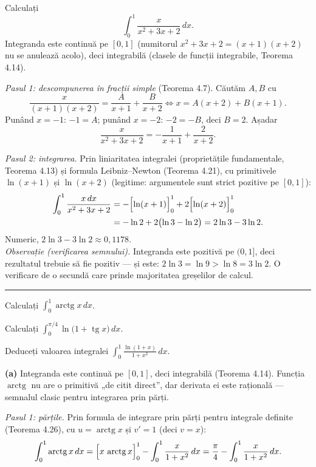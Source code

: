 Calculați
\[ \int_{0}^{1}\frac{x}{x^{2}+3x+2}\,dx . \]
\sol Integranda este continuă pe $[0,1]$ (numitorul $x^{2}+3x+2=(x+1)(x+2)$ nu se anulează acolo), deci integrabilă (clasele de funcții integrabile, Teorema 4.14).

\emph{Pasul 1: descompunerea în fracții simple} (Teorema 4.7). Căutăm $A,B$ cu
\[ \frac{x}{(x+1)(x+2)}=\frac{A}{x+1}+\frac{B}{x+2} \Longleftrightarrow x=A(x+2)+B(x+1) . \]
Punând $x=-1$: $-1=A$; punând $x=-2$: $-2=-B$, deci $B=2$. Așadar
\[ \frac{x}{x^{2}+3x+2}=-\frac{1}{x+1}+\frac{2}{x+2} . \]

\emph{Pasul 2: integrarea.} Prin liniaritatea integralei (proprietățile fundamentale, Teorema 4.13) și formula Leibniz--Newton (Teorema 4.21), cu primitivele $\ln(x+1)$ și $\ln(x+2)$ (legitime: argumentele sunt strict pozitive pe $[0,1]$):
\[ \begin{aligned} \int_{0}^{1}\frac{x\,dx}{x^{2}+3x+2}&=-\Bigl[\ln(x+1)\Bigr]_{0}^{1}+2\Bigl[\ln(x+2)\Bigr]_{0}^{1}\\ &=-\ln2+2\bigl(\ln3-\ln2\bigr)=2\ln3-3\ln2 . \end{aligned} \]
Numeric, $2\ln3-3\ln2\approx0{,}1178$.\\[2pt]
\emph{Observație (verificarea semnului).} Integranda este pozitivă pe $(0,1]$, deci rezultatul trebuie să fie pozitiv --- și este: $2\ln3=\ln9>\ln8=3\ln2$. O verificare de o secundă care prinde majoritatea greșelilor de calcul.
\vspace{1mm}\hrule

\begin{parti}
  \item Calculați $\displaystyle\int_{0}^{1}\operatorname{arctg}x\,dx$.
  \item Calculați $\displaystyle\int_{0}^{\pi/4}\ln\bigl(1+\operatorname{tg}x\bigr)\,dx$.
  \item Deduceți valoarea integralei $\displaystyle\int_{0}^{1}\frac{\ln(1+x)}{1+x^{2}}\,dx$.
\end{parti}
\sol \textbf{(a)} Integranda este continuă pe $[0,1]$, deci integrabilă (Teorema 4.14). Funcția $\operatorname{arctg}$ nu are o primitivă „de citit direct'', dar derivata ei este rațională --- semnalul clasic pentru integrarea prin părți.

\emph{Pasul 1: părțile.} Prin formula de integrare prin părți pentru integrale definite (Teorema 4.26), cu $u=\operatorname{arctg}x$ și $v'=1$ (deci $v=x$):
\[ \int_{0}^{1}\operatorname{arctg}x\,dx=\Bigl[x\,\operatorname{arctg}x\Bigr]_{0}^{1}-\int_{0}^{1}\frac{x}{1+x^{2}}\,dx=\frac{\pi}{4}-\int_{0}^{1}\frac{x}{1+x^{2}}\,dx . \]

